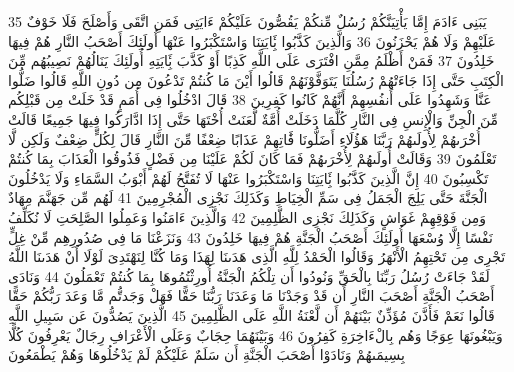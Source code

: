 \documentclass[20pt,a4paper]{article}
\begin{document}
{\tiny\colorbox{cl_aya}{35}} يَبَنِى ءَادَمَ إِمَّا يَأْتِيَنَّكُمْ رُسُلٌ مِّنكُمْ يَقُصُّونَ عَلَيْكُمْ ءَايَتِى فَمَنِ اتَّقَى وَأَصْلَحَ فَلَا خَوْفٌ عَلَيْهِمْ وَلَا هُمْ يَحْزَنُونَ
{\tiny\colorbox{cl_aya}{36}} وَالَّذِينَ كَذَّبُوا بَِٔايَتِنَا وَاسْتَكْبَرُوا عَنْهَا أُولَئِكَ أَصْحَبُ النَّارِ هُمْ فِيهَا خَلِدُونَ
{\tiny\colorbox{cl_aya}{37}} فَمَنْ أَظْلَمُ مِمَّنِ افْتَرَى عَلَى اللَّهِ كَذِبًا أَوْ كَذَّبَ بَِٔايَتِهِ أُولَئِكَ يَنَالُهُمْ نَصِيبُهُم مِّنَ الْكِتَبِ حَتَّى إِذَا جَاءَتْهُمْ رُسُلُنَا يَتَوَفَّوْنَهُمْ قَالُوا أَيْنَ مَا كُنتُمْ تَدْعُونَ مِن دُونِ اللَّهِ قَالُوا ضَلُّوا عَنَّا وَشَهِدُوا عَلَى أَنفُسِهِمْ أَنَّهُمْ كَانُوا كَفِرِينَ
{\tiny\colorbox{cl_aya}{38}} قَالَ ادْخُلُوا فِى أُمَمٍ قَدْ خَلَتْ مِن قَبْلِكُم مِّنَ الْجِنِّ وَالْإِنسِ فِى النَّارِ كُلَّمَا دَخَلَتْ أُمَّةٌ لَّعَنَتْ أُخْتَهَا حَتَّى إِذَا ادَّارَكُوا فِيهَا جَمِيعًا قَالَتْ أُخْرَىهُمْ لِأُولَىهُمْ رَبَّنَا هَؤُلَاءِ أَضَلُّونَا فََٔاتِهِمْ عَذَابًا ضِعْفًا مِّنَ النَّارِ قَالَ لِكُلٍّ ضِعْفٌ وَلَكِن لَّا تَعْلَمُونَ
{\tiny\colorbox{cl_aya}{39}} وَقَالَتْ أُولَىهُمْ لِأُخْرَىهُمْ فَمَا كَانَ لَكُمْ عَلَيْنَا مِن فَضْلٍ فَذُوقُوا الْعَذَابَ بِمَا كُنتُمْ تَكْسِبُونَ
{\tiny\colorbox{cl_aya}{40}} إِنَّ الَّذِينَ كَذَّبُوا بَِٔايَتِنَا وَاسْتَكْبَرُوا عَنْهَا لَا تُفَتَّحُ لَهُمْ أَبْوَبُ السَّمَاءِ وَلَا يَدْخُلُونَ الْجَنَّةَ حَتَّى يَلِجَ الْجَمَلُ فِى سَمِّ الْخِيَاطِ وَكَذَلِكَ نَجْزِى الْمُجْرِمِينَ
{\tiny\colorbox{cl_aya}{41}} لَهُم مِّن جَهَنَّمَ مِهَادٌ وَمِن فَوْقِهِمْ غَوَاشٍ وَكَذَلِكَ نَجْزِى الظَّلِمِينَ
{\tiny\colorbox{cl_aya}{42}} وَالَّذِينَ ءَامَنُوا وَعَمِلُوا الصَّلِحَتِ لَا نُكَلِّفُ نَفْسًا إِلَّا وُسْعَهَا أُولَئِكَ أَصْحَبُ الْجَنَّةِ هُمْ فِيهَا خَلِدُونَ
{\tiny\colorbox{cl_aya}{43}} وَنَزَعْنَا مَا فِى صُدُورِهِم مِّنْ غِلٍّ تَجْرِى مِن تَحْتِهِمُ الْأَنْهَرُ وَقَالُوا الْحَمْدُ لِلَّهِ الَّذِى هَدَىنَا لِهَذَا وَمَا كُنَّا لِنَهْتَدِىَ لَوْلَا أَنْ هَدَىنَا اللَّهُ لَقَدْ جَاءَتْ رُسُلُ رَبِّنَا بِالْحَقِّ وَنُودُوا أَن تِلْكُمُ الْجَنَّةُ أُورِثْتُمُوهَا بِمَا كُنتُمْ تَعْمَلُونَ
{\tiny\colorbox{cl_aya}{44}} وَنَادَى أَصْحَبُ الْجَنَّةِ أَصْحَبَ النَّارِ أَن قَدْ وَجَدْنَا مَا وَعَدَنَا رَبُّنَا حَقًّا فَهَلْ وَجَدتُّم مَّا وَعَدَ رَبُّكُمْ حَقًّا قَالُوا نَعَمْ فَأَذَّنَ مُؤَذِّنٌ بَيْنَهُمْ أَن لَّعْنَةُ اللَّهِ عَلَى الظَّلِمِينَ
{\tiny\colorbox{cl_aya}{45}} الَّذِينَ يَصُدُّونَ عَن سَبِيلِ اللَّهِ وَيَبْغُونَهَا عِوَجًا وَهُم بِالْءَاخِرَةِ كَفِرُونَ
{\tiny\colorbox{cl_aya}{46}} وَبَيْنَهُمَا حِجَابٌ وَعَلَى الْأَعْرَافِ رِجَالٌ يَعْرِفُونَ كُلًّا بِسِيمَىهُمْ وَنَادَوْا أَصْحَبَ الْجَنَّةِ أَن سَلَمٌ عَلَيْكُمْ لَمْ يَدْخُلُوهَا وَهُمْ يَطْمَعُونَ
\end{document}
